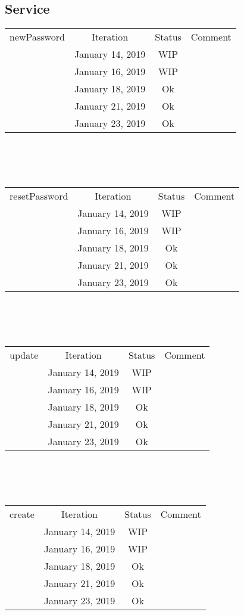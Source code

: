 \documentclass{scrreprt}
\begin{document}
\subsection{Service}
	\begin{tabularx}{12cm}{X|c|c|c}
		newPassword & Iteration & Status & Comment  \\
		& January 14, 2019 & WIP & \\
		& January 16, 2019 & WIP & \\
		& January 18, 2019 & Ok & \\
		& January 21, 2019 & Ok & \\
		& January 23, 2019 & Ok & \\
	\end{tabularx}	
	\\ \\ \\
	\begin{tabularx}{12cm}{X|c|c|c}
		resetPassword & Iteration & Status & Comment  \\
		& January 14, 2019 & WIP & \\
		& January 16, 2019 & WIP & \\
		& January 18, 2019 & Ok & \\
		& January 21, 2019 & Ok & \\
		& January 23, 2019 & Ok & \\
	\end{tabularx}	
	\\ \\ \\
	\begin{tabularx}{12cm}{X|c|c|c}
		update & Iteration & Status & Comment  \\
		& January 14, 2019 & WIP & \\
		& January 16, 2019 & WIP & \\
		& January 18, 2019 & Ok & \\
		& January 21, 2019 & Ok & \\
		& January 23, 2019 & Ok & \\
	\end{tabularx}	
	\\ \\ \\
	\begin{tabularx}{12cm}{X|c|c|c}
		create & Iteration & Status & Comment  \\
		& January 14, 2019 & WIP & \\
		& January 16, 2019 & WIP & \\
		& January 18, 2019 & Ok & \\
		& January 21, 2019 & Ok & \\
		& January 23, 2019 & Ok & \\
	\end{tabularx}	
\end{document}

